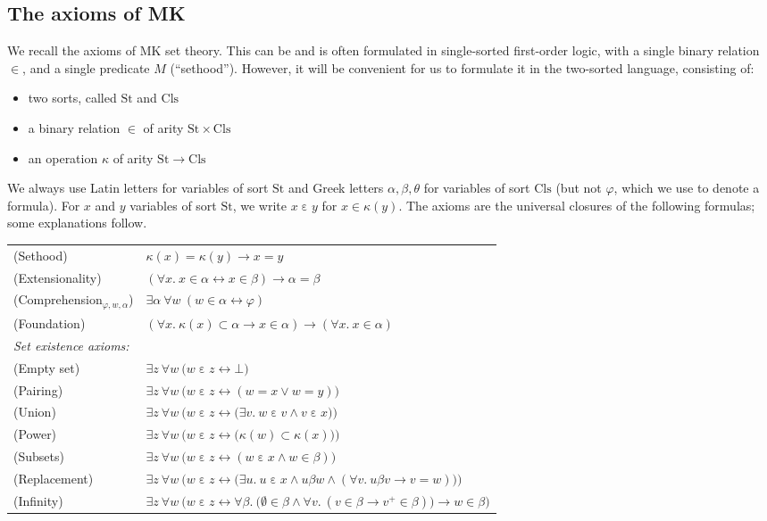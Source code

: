 \documentclass{amsart}
\newcommand\Cls{\mathrm{Cls}}
\newcommand\ein{\mathrel{\varepsilon}}
\newcommand\pbig[1]{\big({#1}\big)}
\newcommand\pBig[1]{\Big({#1}\Big)}
\renewcommand\phi{\varphi}
\newcommand\St{\mathrm{St}}
\newcommand\tot{\leftrightarrow}
\newcommand\unin{{\in}}
\theoremstyle{definition}
\theoremstyle{remark}
\theoremstyle{plainwithref}
\begin{document}
\subsection{The axioms of MK} \label{subsec:axioms-of-mk}
We recall the axioms of MK set theory.
This can be and is often formulated in single-sorted first-order logic, with a single binary relation \( \unin \), and a single predicate \( M \) (``sethood'').
However, it will be convenient for us to formulate it in the two-sorted language, consisting of:
\begin{itemize}
\item two sorts, called \( \St \) and \( \Cls \)
\item a binary relation \( \in \) of arity \( \St \times \Cls \)
\item an operation \( \kappa \) of arity \( \St \to \Cls \)
\end{itemize}
We always use Latin letters for variables of sort \( \St \) and Greek letters \( \alpha,\beta,\theta \) for variables of sort \( \Cls \) (but not \( \phi \), which we use to denote a formula).
For \( x \) and \( y \) variables of sort \( \St \), we write \( x \ein y \) for \( x \in \kappa(y) \).
The axioms are the universal closures of the following formulas; some explanations follow.

\begin{tabular}{ll}
  (Sethood) & \( \kappa(x) = \kappa(y) \to x = y \) \\
  (Extensionality) & \( (\forall x.\ x \in \alpha \tot x \in \beta) \to \alpha = \beta \) \\
  (Comprehension\( _{\phi,w,\alpha} \)) & \( \exists \alpha\ \forall w\ (w \in \alpha \tot \phi) \) \\
  (Foundation) & \( (\forall x.\ \kappa(x) \subset \alpha \to x \in \alpha) \to (\forall x.\ x \in \alpha) \) \\
  \multicolumn{2}{l}{\textit{Set existence axioms:}} \\
  (Empty set) & \( \exists z\ \forall w\ \pBig{w \ein z \tot \bot} \) \\
  (Pairing) & \( \exists z\ \forall w\ \pBig{w \ein z \tot (w = x \vee w = y)} \) \\
  (Union) & \( \exists z\ \forall w\ \pBig{w \ein z \tot \pbig{\exists v.\ w \ein v \wedge v \ein x}}  \) \\
  (Power) & \( \exists z\ \forall w\ \pBig{w \ein z \tot \pbig{\kappa(w) \subset \kappa(x)}}  \) \\
  (Subsets) & \( \exists z\ \forall w\ \pBig{w \ein z \tot (w \ein x \wedge w \in \beta)} \) \\
  (Replacement) & \( \exists z\ \forall w\ \pBig{w \ein z \tot \pbig{\exists u.\ u \ein x \wedge u \beta w \wedge (\forall v.\ u \beta v \to v = w)}} \) \\
  (Infinity) & \( \exists z\ \forall w\ \pBig{w \ein z \tot \forall \beta.\ \pbig{\emptyset \in \beta \wedge \forall v.\ (v \in \beta \to v^+ \in \beta)} \to w \in \beta} \)
\end{tabular}
\end{document}
